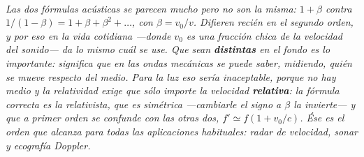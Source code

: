 \begin{center}
\\[0.5em]
{\small\itshape Las dos fórmulas acústicas se parecen mucho pero no son la
misma: $1 + \beta$ contra $1/(1-\beta) = 1 + \beta + \beta^2 + \dots$, con
$\beta = v_0/v$. Difieren recién en el segundo orden, y por eso en la vida
cotidiana ---donde $v_0$ es una fracción chica de la velocidad del sonido--- da
lo mismo cuál se use. Que sean \textbf{distintas} en el fondo es lo importante:
significa que en las ondas mecánicas se puede saber, midiendo, quién se mueve
respecto del medio. Para la luz eso sería inaceptable, porque no hay medio y la
relatividad exige que sólo importe la velocidad \textbf{relativa}: la fórmula
correcta es la relativista, que es simétrica ---cambiarle el signo a $\beta$ la
invierte--- y que a primer orden se confunde con las otras dos,
$f' \simeq f(1 + v_0/c)$. Ése es el orden que alcanza para todas las
aplicaciones habituales: radar de velocidad, sonar y ecografía Doppler.}
\end{center}
